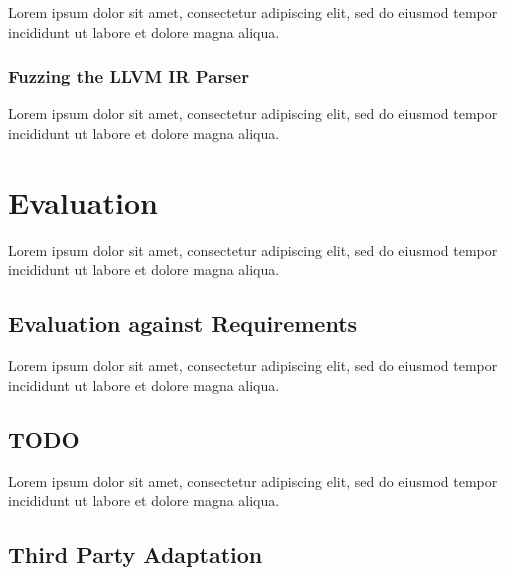\documentclass[12pt, a4paper]{article}
\begin{document}
Lorem ipsum dolor sit amet, consectetur adipiscing elit, sed do eiusmod tempor incididunt ut labore et dolore magna aliqua.


\subsubsection{Fuzzing the LLVM IR Parser}

Lorem ipsum dolor sit amet, consectetur adipiscing elit, sed do eiusmod tempor incididunt ut labore et dolore magna aliqua.



\section{Evaluation}

Lorem ipsum dolor sit amet, consectetur adipiscing elit, sed do eiusmod tempor incididunt ut labore et dolore magna aliqua.


\subsection{Evaluation against Requirements}

Lorem ipsum dolor sit amet, consectetur adipiscing elit, sed do eiusmod tempor incididunt ut labore et dolore magna aliqua.


\subsection{TODO}

Lorem ipsum dolor sit amet, consectetur adipiscing elit, sed do eiusmod tempor incididunt ut labore et dolore magna aliqua.


\subsection{Third Party Adaptation}
\end{document}

